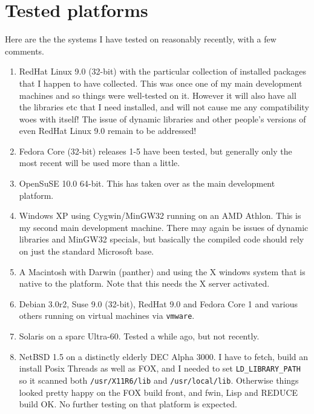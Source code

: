 \documentclass[11pt]{article}
\begin{document}
\section{Tested platforms}
Here are the the systems I have tested on reasonably recently, with a few
comments. 
\begin{enumerate}
\item RedHat Linux 9.0 (32-bit) with the particular
collection of installed packages that I happen to have collected. This was
once one of my main development machines and so things were well-tested on it.
However it will also have all the libraries etc that I need installed,
and will not cause me any compatibility woes with itself! The issue
of dynamic libraries and other people's versions of even RedHat Linux 9.0
remain to be addressed!
\item Fedora Core (32-bit) releases 1-5 have been tested, but generally only
the most recent will be used more than a little.
\item OpenSuSE 10.0 64-bit. This has taken over as the main development
platform.
\item Windows XP using Cygwin/MinGW32 running on an AMD Athlon. This is my
second main development machine. There may again be issues of dynamic
libraries and MinGW32 specials, but basically the compiled code should rely
on just the standard Microsoft base.
\item A Macintosh with Darwin (panther) and using the X windows system that is
native to the platform. Note that this needs the X server activated.
\item Debian 3.0r2, Suse 9.0 (32-bit), RedHat 9.0 and Fedora Core 1
and various others running on virtual machines via \verb+vmware+.
\item Solaris on a sparc Ultra-60. Tested a while ago, but not recently.
\item NetBSD 1.5 on a distinctly elderly DEC Alpha 3000. I have to
fetch, build an install Posix Threads as well as FOX, and
I needed to set \verb+LD_LIBRARY_PATH+ so it scanned both 
\verb+/usr/X11R6/lib+ and \verb+/usr/local/lib+. Otherwise things looked
pretty happy on the FOX build front, and fwin, Lisp and REDUCE build OK. 
No further testing on that platform is expected.

\end{enumerate}
\end{document}
